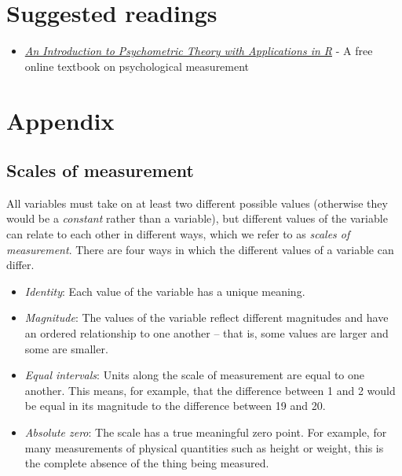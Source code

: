\documentclass[12pt,]{book}
\providecommand{\tightlist}{%
  \setlength{\itemsep}{0pt}\setlength{\parskip}{0pt}}
\theoremstyle{definition}
\theoremstyle{definition}
\theoremstyle{definition}
\theoremstyle{remark}
\begin{document}
\hypertarget{suggested-readings-1}{%
\section{Suggested readings}\label{suggested-readings-1}}

\begin{itemize}
\tightlist
\item
  \href{http://www.personality-project.org/r/book/}{\emph{An Introduction to Psychometric Theory with Applications in R}} - A free online textbook on psychological measurement
\end{itemize}

\hypertarget{appendix}{%
\section{Appendix}\label{appendix}}

\hypertarget{scales-of-measurement}{%
\subsection{Scales of measurement}\label{scales-of-measurement}}

All variables must take on at least two different possible values (otherwise they would be a \emph{constant} rather than a variable), but different values of the variable can relate to each other in different ways, which we refer to as \emph{scales of measurement}. There are four ways in which the different values of a variable can differ.

\begin{itemize}
\tightlist
\item
  \emph{Identity}: Each value of the variable has a unique meaning.\\
\item
  \emph{Magnitude}: The values of the variable reflect different magnitudes and have an ordered relationship to one another -- that is, some values are larger and some are smaller.
\item
  \emph{Equal intervals}: Units along the scale of measurement are equal to one another. This means, for example, that the difference between 1 and 2 would be equal in its magnitude to the difference between 19 and 20.
\item
  \emph{Absolute zero}: The scale has a true meaningful zero point. For example, for many measurements of physical quantities such as height or weight, this is the complete absence of the thing being measured.
\end{itemize}
\end{document}
